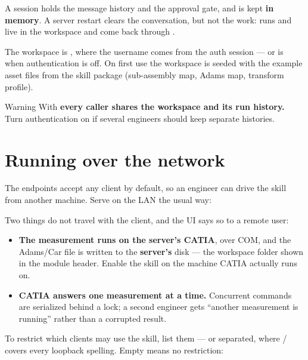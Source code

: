A session holds the message history and the approval gate, and is kept
\textbf{in memory}. A server restart clears the conversation, but not the work:
runs and  live in the workspace and come back through
.

The workspace is , where the
username comes from the auth session --- or is  when authentication
is off. On first use the workspace is seeded with the example asset files from
the skill package (sub-assembly map, Adams map, transform profile).

\begin{callout}{Warning}
With  \textbf{every caller shares the 
workspace and its run history.} Turn authentication on if several engineers
should keep separate histories.
\end{callout}

\section{Running over the network}

The endpoints accept any client by default, so an engineer can drive the skill
from another machine. Serve on the LAN the usual way:


Two things do not travel with the client, and the UI says so to a remote user:

\begin{itemize}
\item \textbf{The measurement runs on the server's CATIA}, over COM, and the
Adams/Car  file is written to the \textbf{server's} disk --- the
workspace folder shown in the module header. Enable the skill on the machine
CATIA actually runs on.
\item \textbf{CATIA answers one measurement at a time.} Concurrent 
commands are serialized behind a lock; a second engineer gets ``another
measurement is running'' rather than a corrupted result.
\end{itemize}

To restrict which clients may use the skill, list them --- \code{;} or \code{,}
separated, where / covers every loopback spelling.
Empty means no restriction:

